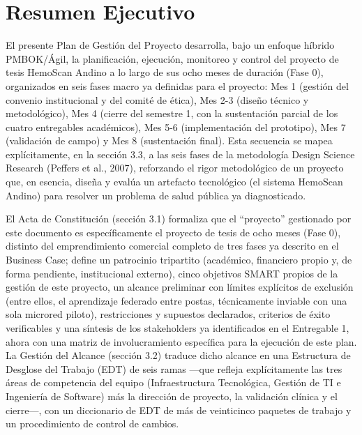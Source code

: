 \documentclass[11pt,a4paper]{article}
\begin{document}
\section{Resumen Ejecutivo}\label{resumen-ejecutivo}

El presente Plan de Gestión del Proyecto desarrolla, bajo un enfoque híbrido PMBOK/Ágil, la planificación, ejecución, monitoreo y control del proyecto de tesis HemoScan Andino a lo largo de sus ocho meses de duración (Fase 0), organizados en seis fases macro ya definidas para el proyecto: Mes 1 (gestión del convenio institucional y del comité de ética), Mes 2-3 (diseño técnico y metodológico), Mes 4 (cierre del semestre 1, con la sustentación parcial de los cuatro entregables académicos), Mes 5-6 (implementación del prototipo), Mes 7 (validación de campo) y Mes 8 (sustentación final). Esta secuencia se mapea explícitamente, en la sección 3.3, a las seis fases de la metodología Design Science Research (Peffers et al., 2007), reforzando el rigor metodológico de un proyecto que, en esencia, diseña y evalúa un artefacto tecnológico (el sistema HemoScan Andino) para resolver un problema de salud pública ya diagnosticado.

El Acta de Constitución (sección 3.1) formaliza que el ``proyecto'' gestionado por este documento es específicamente el proyecto de tesis de ocho meses (Fase 0), distinto del emprendimiento comercial completo de tres fases ya descrito en el Business Case; define un patrocinio tripartito (académico, financiero propio y, de forma pendiente, institucional externo), cinco objetivos SMART propios de la gestión de este proyecto, un alcance preliminar con límites explícitos de exclusión (entre ellos, el aprendizaje federado entre postas, técnicamente inviable con una sola microred piloto), restricciones y supuestos declarados, criterios de éxito verificables y una síntesis de los stakeholders ya identificados en el Entregable 1, ahora con una matriz de involucramiento específica para la ejecución de este plan. La Gestión del Alcance (sección 3.2) traduce dicho alcance en una Estructura de Desglose del Trabajo (EDT) de seis ramas ---que refleja explícitamente las tres áreas de competencia del equipo (Infraestructura Tecnológica, Gestión de TI e Ingeniería de Software) más la dirección de proyecto, la validación clínica y el cierre---, con un diccionario de EDT de más de veinticinco paquetes de trabajo y un procedimiento de control de cambios.
\end{document}
